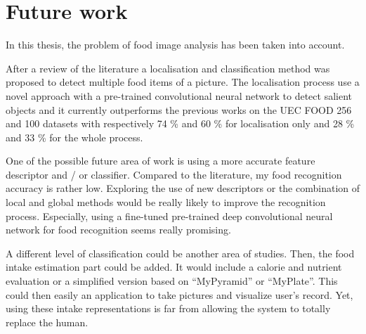 \chapter{Future work} \label{sec:conclusion}

In this thesis, the problem of food image analysis has been taken into account.

After a review of the literature a localisation and classification method was proposed to detect multiple food items of a picture. The localisation process use a novel approach with a pre-trained convolutional neural network to detect salient objects and it currently outperforms the previous works on the UEC FOOD 256 and 100 datasets with respectively 74 \% and 60 \% for localisation only and 28 \% and 33 \% for the whole process.

One of the possible future area of work is using a more accurate feature descriptor and / or classifier. Compared to the literature, my food recognition accuracy is rather low. Exploring the use of new descriptors or the combination of local and global methods would be really likely to improve the recognition process. Especially, using a fine-tuned pre-trained deep convolutional neural network for food recognition seems really promising.

A different level of classification could be another area of studies. Then, the food intake estimation part could be added. It would include a calorie and nutrient evaluation or a simplified version based on \enquote{MyPyramid} or \enquote{MyPlate}. This could then easily  an application to take pictures and visualize user's record. Yet, using these intake representations is far from allowing the system to totally replace the human.